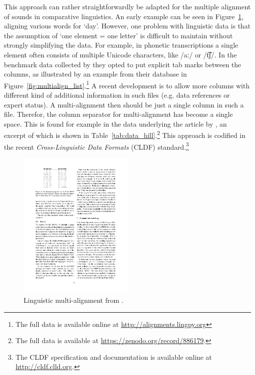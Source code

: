 \documentclass[11pt]{article}
\begin{document}
This approach can rather straightforwardly be adapted for the multiple alignment of sounds in comparative linguistics. An early example can be seen in Figure~\ref{fig:multialign_bhargava}, aligning various words for `day'. However, one problem with linguistic data is that the assumption of `one element = one letter' is difficult to maintain without strongly simplifying the data. For example, in phonetic transcriptions a single element often consists of multiple Unicode characters, like /aː/ or /t͡ʃ/. In the benchmark data collected by \textcite{list2014benchmark} they opted to put explicit tab marks between the columns, as illustrated by an example from their database in Figure~\ref{fig:multialign_list}.\footnote{The full data is available online at \url{http://alignments.lingpy.org}} A recent development is to allow more columns with different kind of additional information in such files (e.g. data references or expert status). A multi-alignment then should be just a single column in such a file. Therefor, the column separator for multi-alignment has become a single space. This is found for example in the data underlying the article by \textcite{hill2017}, an excerpt of which is shown in Table~\ref{tab:data_hill}.\footnote{The full data is available at \url{https://zenodo.org/record/886179}.} This approach is codified in the recent \textit{Cross-Linguistic Data Formats} (CLDF) standard.\footnote{The CLDF specification and documentation is available online at \url{http://cldf.clld.org}.}

\begin{figure}[htbp]
  \centering
  \includegraphics[width=0.5\textwidth]{images/multialign_bhargava.pdf}
  \caption{Linguistic multi-alignment from \textcite[47]{bhargava2009}.}
  \label{fig:multialign_bhargava}
\end{figure}
\end{document}
